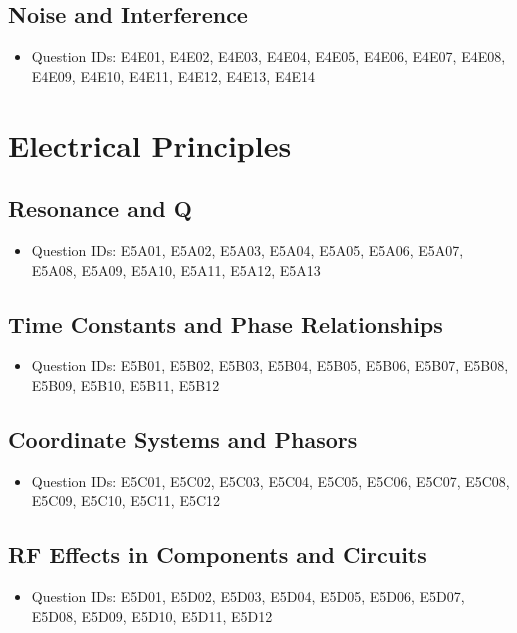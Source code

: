 \documentclass{book}
\begin{document}
\section{Noise and Interference}
\begin{itemize}
    \item Question IDs: E4E01, E4E02, E4E03, E4E04, E4E05, E4E06, E4E07, E4E08, E4E09, E4E10, E4E11, E4E12, E4E13, E4E14
\end{itemize}

\chapter{Electrical Principles}
\section{Resonance and Q}
\begin{itemize}
    \item Question IDs: E5A01, E5A02, E5A03, E5A04, E5A05, E5A06, E5A07, E5A08, E5A09, E5A10, E5A11, E5A12, E5A13
\end{itemize}

\section{Time Constants and Phase Relationships}
\begin{itemize}
    \item Question IDs: E5B01, E5B02, E5B03, E5B04, E5B05, E5B06, E5B07, E5B08, E5B09, E5B10, E5B11, E5B12
\end{itemize}

\section{Coordinate Systems and Phasors}
\begin{itemize}
    \item Question IDs: E5C01, E5C02, E5C03, E5C04, E5C05, E5C06, E5C07, E5C08, E5C09, E5C10, E5C11, E5C12
\end{itemize}

\section{RF Effects in Components and Circuits}
\begin{itemize}
    \item Question IDs: E5D01, E5D02, E5D03, E5D04, E5D05, E5D06, E5D07, E5D08, E5D09, E5D10, E5D11, E5D12
\end{itemize}
\end{document}
